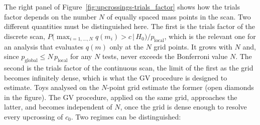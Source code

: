 The right panel of Figure~\ref{fig:upcrossings-trials_factor} shows how the trials factor depends on the number $N$ of equally spaced mass points in the scan. Two different quantities must be distinguished here. The first is the trials factor of the discrete scan, $P\big(\max_{i=1,\dots,N} q(m_i)>c\,\big|\,H_0\big)/p_\text{local}$, which is the relevant one for an analysis that evaluates $q(m)$ only at the $N$ grid points. It grows with $N$ and, since $p_\text{global}\leq N\,p_\text{local}$ for any $N$ tests, never exceeds the Bonferroni value $N$. The second is the trials factor of the continuous scan, the limit of the first as the grid becomes infinitely dense, which is what the GV procedure is designed to estimate. Toys analysed on the $N$-point grid estimate the former (open diamonds in the figure). The GV procedure, applied on the same grid, approaches the latter, and becomes independent of $N$, once the grid is dense enough to resolve every upcrossing of $c_0$. Two regimes can be distinguished:
